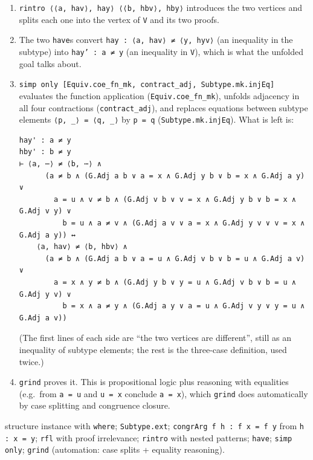 \documentclass[11pt,a4paper]{article}
\newcommand{\lean}[1]{\texttt{\textcolor{leanink}{#1}}}
\newcommand{\tacs}{\par\smallskip{\sffamily\bfseries\color{tactic}Tactics and tools.}\enspace}
\begin{document}
\begin{enumerate}
\item \lean{rintro ⟨⟨a, hav⟩, hay⟩ ⟨⟨b, hbv⟩, hby⟩} introduces the two vertices and splits each
  one into the vertex of \lean{V} and its two proofs.
\item The two \lean{have}s convert \lean{hay : ⟨a, hav⟩ ≠ ⟨y, hyv⟩} (an inequality in the subtype)
  into \lean{hay' : a ≠ y} (an inequality in \lean{V}), which is what the unfolded goal talks about.
\item \lean{simp only [Equiv.coe\_\allowbreak{}fn\_\allowbreak{}mk, contract\_\allowbreak{}adj, Subtype.mk.injEq]} evaluates the function
  application (\lean{Equiv.coe\_\allowbreak{}fn\_\allowbreak{}mk}), unfolds adjacency in all four contractions
  (\lean{contract\_\allowbreak{}adj}), and replaces equations between subtype elements
  \lean{⟨p, \_\allowbreak{}⟩ = ⟨q, \_\allowbreak{}⟩} by \lean{p = q} (\lean{Subtype.mk.injEq}). What is left is:
\begin{leansays}
\begin{Verbatim}[fontsize=\scriptsize]
hay' : a ≠ y
hby' : b ≠ y
⊢ ⟨a, ⋯⟩ ≠ ⟨b, ⋯⟩ ∧
      (a ≠ b ∧ (G.Adj a b ∨ a = x ∧ G.Adj y b ∨ b = x ∧ G.Adj a y) ∨
        a = u ∧ v ≠ b ∧ (G.Adj v b ∨ v = x ∧ G.Adj y b ∨ b = x ∧ G.Adj v y) ∨
          b = u ∧ a ≠ v ∧ (G.Adj a v ∨ a = x ∧ G.Adj y v ∨ v = x ∧ G.Adj a y)) ↔
    ⟨a, hav⟩ ≠ ⟨b, hbv⟩ ∧
      (a ≠ b ∧ (G.Adj a b ∨ a = u ∧ G.Adj v b ∨ b = u ∧ G.Adj a v) ∨
        a = x ∧ y ≠ b ∧ (G.Adj y b ∨ y = u ∧ G.Adj v b ∨ b = u ∧ G.Adj y v) ∨
          b = x ∧ a ≠ y ∧ (G.Adj a y ∨ a = u ∧ G.Adj v y ∨ y = u ∧ G.Adj a v))
\end{Verbatim}
\end{leansays}
  (The first lines of each side are “the two vertices are different”, still as an inequality of
  subtype elements; the rest is the three-case definition, used twice.)
\item \lean{grind} proves it. This is propositional logic plus reasoning with equalities
  (e.g.\ from \lean{a = u} and \lean{u = x} conclude \lean{a = x}), which \lean{grind} does
  automatically by case splitting and congruence closure.
\end{enumerate}

\tacs structure instance with \lean{where}; \lean{Subtype.ext}; \lean{congrArg f h : f x = f y} from
\lean{h : x = y}; \lean{rfl} with proof irrelevance; \lean{rintro} with nested patterns;
\lean{have}; \lean{simp only}; \lean{grind} (automation: case splits + equality reasoning).
\end{document}
